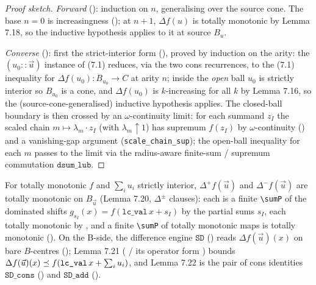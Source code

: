 \begin{proof}[Proof sketch]
\emph{Forward} ():
induction on $n$, generalising over the source cone. The base $n = 0$ is
increasingness (); at
$n+1$, $\Delta f(u)$ is totally monotonic by Lemma 7.18, so the
inductive hypothesis applies to it at source $B_u$.

\emph{Converse} ():
first the strict-interior form
(), proved by induction on the
arity: the $(u_0 :: \vec u)$ instance of (7.1) reduces, via the two cons
recurrences, to the (7.1) inequality for $\Delta f(u_0) : B_{u_0} \to C$
at arity $n$; inside the \emph{open} ball $u_0$ is strictly interior so
$B_{u_0}$ is a cone, and $\Delta f(u_0)$ is $k$-increasing for all $k$
by Lemma 7.16, so the (source-cone-generalised) inductive hypothesis
applies. The closed-ball boundary is then crossed by an
$\omega$-continuity limit: for each summand $z_I$ the scaled chain
$m \mapsto \lambda_m \cdot z_I$ (with $\lambda_m \uparrow 1$) has
supremum $f(z_I)$ by $\omega$-continuity
() and a vanishing-gap
argument (\texttt{scale\_chain\_sup}); the open-ball inequality for each
$m$ passes to the limit via the radius-aware finite-sum / supremum
commutation $\texttt{dsum\_lub}$.
\end{proof}

\begin{lemma}
\label{lem:720-722}
\rocqok
{}\rocqok{}
For totally monotonic $f$ and $\sum_i u_i$ strictly interior, $\Delta^+
f(\vec u)$ and $\Delta^- f(\vec u)$ are totally monotonic on $B_{\vec
u}$ (Lemma 7.20, $\Delta^\pm$ clauses): each is a finite \texttt{\textbackslash sumP} of the
dominated shifts $g_{s_I}(x) = f(\texttt{lc\_val}\,x + s_I)$ by the
partial sums $s_I$, each totally monotonic by
, and a finite \texttt{\textbackslash sumP} of
totally monotonic maps is totally monotonic
(). On the B-side, the
difference engine $\texttt{SD}$
() reads $\Delta f(\vec u)(x)$ on bare
$B$-centres (); Lemma 7.21
( / its operator form
) bounds $\Delta f(\vec u)(x) \preceq
f(\texttt{lc\_val}\,x + \sum_i u_i)$, and Lemma 7.22 is the pair of cons
identities $\texttt{SD\_cons}$
() and $\texttt{SD\_add}$
().
\end{lemma}

